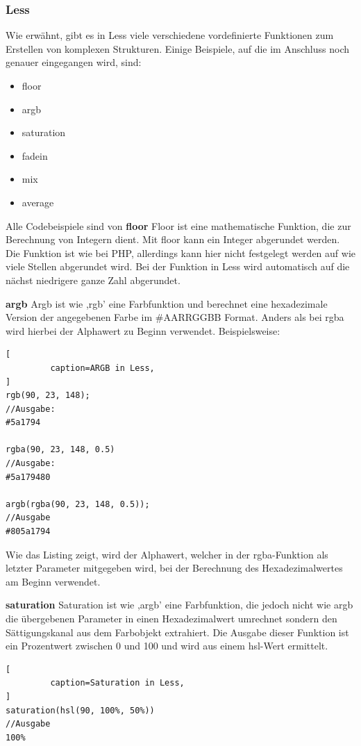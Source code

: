 \subsubsection{Less}
Wie erwähnt, gibt es in Less viele verschiedene vordefinierte Funktionen zum Erstellen von komplexen Strukturen. Einige Beispiele, auf die im Anschluss noch genauer eingegangen wird, sind:
\begin{itemize}
  \item{floor}
  \item{argb}
  \item{saturation}
  \item{fadein}
  \item{mix}
  \item{average}
\end{itemize}
Alle Codebeispiele sind von \autocite[]{Sellier.2013b}
\textbf{floor}\newline
Floor ist eine mathematische Funktion, die zur Berechnung von Integern dient. Mit floor kann ein Integer abgerundet werden. Die Funktion ist wie bei PHP, allerdings kann hier nicht festgelegt werden auf wie viele Stellen abgerundet wird. Bei der Funktion in Less wird automatisch auf die nächst niedrigere ganze Zahl abgerundet.

\textbf{argb}\newline
Argb ist wie ,rgb' eine Farbfunktion und berechnet eine hexadezimale  Version der angegebenen Farbe im \#AARRGGBB Format. Anders als bei rgba wird hierbei der Alphawert zu Beginn verwendet. Beispielsweise:
\begin{lstlisting}[
         caption=ARGB in Less,
]
rgb(90, 23, 148);
//Ausgabe:
#5a1794

rgba(90, 23, 148, 0.5)
//Ausgabe:
#5a179480

argb(rgba(90, 23, 148, 0.5));
//Ausgabe
#805a1794
\end{lstlisting}
Wie das Listing zeigt, wird der Alphawert, welcher in der rgba-Funktion als letzter Parameter mitgegeben wird, bei der Berechnung des Hexadezimalwertes am Beginn verwendet. 

\textbf{saturation}\newline
Saturation ist wie ,argb' eine Farbfunktion, die jedoch nicht wie argb die übergebenen Parameter in einen Hexadezimalwert umrechnet sondern den Sättigungskanal aus dem Farbobjekt extrahiert. Die Ausgabe dieser Funktion ist ein Prozentwert zwischen 0 und 100 und wird aus einem hsl-Wert ermittelt.
\begin{lstlisting}[
         caption=Saturation in Less,
]
saturation(hsl(90, 100%, 50%))
//Ausgabe
100%
\end{lstlisting}

